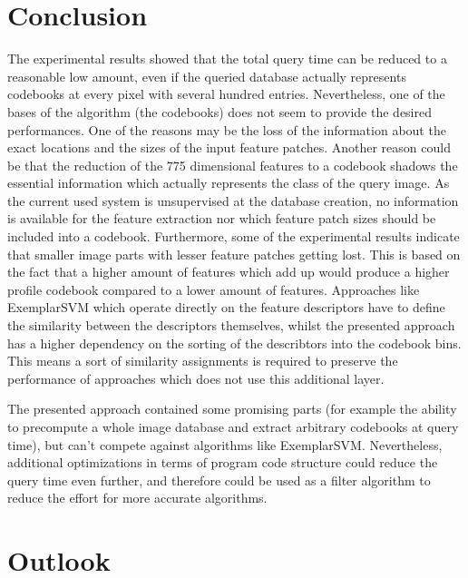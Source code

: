 \chapter{Conclusion}

The experimental results showed that the total query time can be reduced to a reasonable low amount, even if the queried database actually represents codebooks at every pixel with several hundred entries. Nevertheless, one of the bases of the algorithm (the codebooks) does not seem to provide the desired performances. One of the reasons may be the loss of the information about the exact locations and the sizes of the input feature patches. Another reason could be that the reduction of the 775 dimensional features to a codebook shadows the essential information which actually represents the class of the query image. As the current used system is unsupervised at the database creation, no information is available for the feature extraction nor which feature patch sizes should be included into a codebook. Furthermore, some of the experimental results indicate that smaller image parts with lesser feature patches getting lost. This is based on the fact that a higher amount of features which add up would produce a higher profile codebook compared to a lower amount of features. Approaches like ExemplarSVM which operate directly on the feature descriptors have to define the similarity between the descriptors themselves, whilst the presented approach has a higher dependency on the sorting of the describtors into the codebook bins. This means a sort of similarity assignments is required to preserve the performance of approaches which does not use this additional layer.

The presented approach contained some promising parts (for example the ability to precompute a whole image database and extract arbitrary codebooks at query time), but can't compete against algorithms like ExemplarSVM. Nevertheless, additional optimizations in terms of program code structure could reduce the query time even further, and therefore could be used as a filter algorithm to reduce the effort for more accurate algorithms.

\chapter{Outlook}


